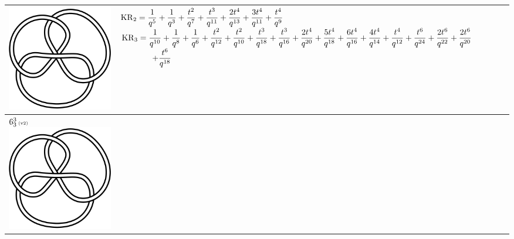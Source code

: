 \documentclass{compositio}
\theoremstyle{definition}
\numberwithin{equation}{section}
\begin{document}
{\begin{longtable}{p{}|p{}}
\includegraphics[scale=0.07,angle=0]{link6_3_3.pdf} 
& 
$
\displaystyle{%
\KR_{2} = \frac{1}{q^5}+\frac{1}{q^3}+\frac{t^2}{q^7}+\frac{t^3}{q^{11}}+\frac{2 t^4}{q^{13}}+\frac{3 t^4}{q^{11}}+\frac{t^4}{q^9}
}
$
\newline 
$
\displaystyle{%
\KR_{3} = \frac{1}{q^{10}}+\frac{1}{q^8}+\frac{1}{q^6}+\frac{t^2}{q^{12}}+\frac{t^2}{q^{10}}+\frac{t^3}{q^{18}}+\frac{t^3}{q^{16}}+\frac{2 t^4}{q^{20}}+\frac{5 t^4}{q^{18}}+\frac{6 t^4}{q^{16}}+\frac{4 t^4}{q^{14}}+\frac{t^4}{q^{12}}+\frac{t^6}{q^{24}}+\frac{2 t^6}{q^{22}}+\frac{2 t^6}{q^{20}}
}
$
\newline
$
\displaystyle{%
\qquad\qquad +\frac{t^6}{q^{18}}
}
$
\\
\hline
$6_{3}^3\,\text{{\tiny (v2)}}$
\includegraphics[scale=0.07,angle=0]{link6_3_3.pdf} 

\end{longtable}}
\end{document}
